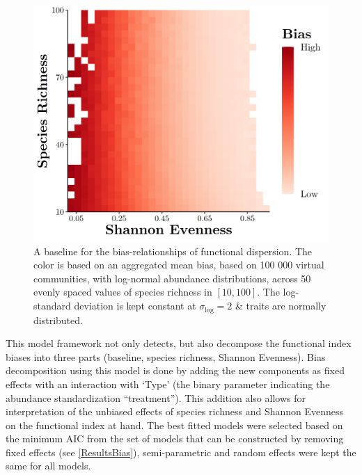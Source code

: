 \documentclass[
  10pt,
]{article}
\begin{document}
\begin{figure}
  \vspace{-0.5cm}
  \centering
  \includegraphics[width=\linewidth]{../Final Visualizations/exampleRandomWeights.png}
  \caption{A baseline for the bias-relationships of functional dispersion. The color is based on an aggregated mean bias, based on 100 000 virtual communities, with log-normal abundance distributions, across 50 evenly spaced values of species richness in $[10,100]$. The log-standard deviation is kept constant at $\sigma_{\log}=2$ \& traits are normally distributed.}
  \label{fig:simFDis}
\end{figure}

This model framework not only detects, but also decompose the functional index biases into three parts (baseline, species richness, Shannon Evenness). Bias decomposition using this model is done by adding the new components as fixed effects with an interaction with `Type' (the binary parameter indicating the abundance standardization ``treatment''). This addition also allows for interpretation of the unbiased effects of species richness and Shannon Evenness on the functional index at hand. The best fitted models were selected based on the minimum AIC from the set of models that can be constructed by removing fixed effects (see \autoref{ResultsBias}), semi-parametric and random effects were kept the same for all models.
\end{document}
